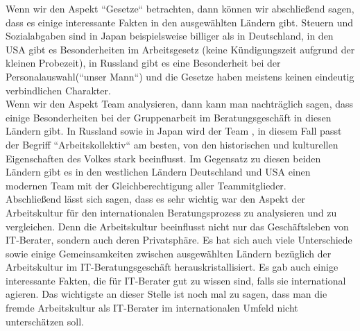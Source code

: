 Wenn wir den Aspekt ``Gesetze`` betrachten, dann können wir abschließend sagen, dass es einige interessante Fakten in den ausgewählten Ländern gibt. Steuern und Sozialabgaben sind in Japan beispielsweise billiger als in Deutschland, in den USA gibt es Besonderheiten im Arbeitsgesetz (keine Kündigungszeit aufgrund der kleinen Probezeit), in Russland gibt es eine Besonderheit bei der Personalauswahl(``unser Mann``) und die Gesetze haben meistens keinen eindeutig verbindlichen Charakter.\\
Wenn wir den Aspekt Team analysieren, dann kann man nachträglich sagen, dass einige Besonderheiten bei der Gruppenarbeit im Beratungsgeschäft in diesen Ländern gibt. In Russland sowie in Japan wird der Team , in diesem Fall passt der Begriff ``Arbeitskollektiv`` am besten, von den historischen und kulturellen Eigenschaften des Volkes stark beeinflusst. Im Gegensatz zu diesen beiden Ländern gibt es in den westlichen Ländern Deutschland und USA einen modernen Team mit der Gleichberechtigung aller Teammitglieder.\\
Abschließend lässt sich sagen, dass es sehr wichtig war den Aspekt der Arbeitskultur für den internationalen Beratungsprozess zu analysieren und zu vergleichen. Denn die Arbeitskultur beeinflusst nicht nur das Geschäftsleben von IT-Berater, sondern auch deren Privatsphäre. Es hat sich auch viele Unterschiede sowie einige Gemeinsamkeiten zwischen ausgewählten Ländern bezüglich der Arbeitskultur im IT-Beratungsgeschäft herauskristallisiert. Es gab auch einige interessante Fakten, die für IT-Berater gut zu wissen sind, falls sie international agieren. Das wichtigste an dieser Stelle ist noch mal zu sagen, dass man die fremde Arbeitskultur als IT-Berater im internationalen Umfeld nicht unterschätzen soll.
